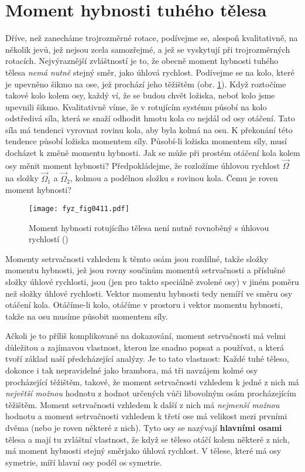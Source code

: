   \section{Moment hybnosti tuhého tělesa}\label{fyz:IchapXXsecIV}
    Dříve, než zanecháme trojrozměrné rotace, podívejme se, alespoň kvalitativně, na několik jevů,
    jež nejsou zcela samozřejmé, a jež se vyskytují při trojrozměrných rotacích. Nejvýraznější
    zvláštností je to, že obecně moment hybnosti tuhého tělesa \emph{nemá nutně} stejný směr, jako
    úhlová rychlost. Podívejme se na kolo, které je upevněno šikmo na ose, jež prochází jeho
    těžištěm (obr. \ref{fyz:fig0411}). Když roztočíme takové kolo kolem osy, každý ví, že se budou
    chvět ložiska, neboť kolo jsme upevnili šikmo. Kvalitativně víme, že v rotujícím systému působí
    na kolo odstředivá síla, která se snaží odhodit hmotu kola co nejdál od osy otáčení. Tato síla
    má tendenci vyrovnat rovinu kola, aby byla kolmá na osu. K překonání této tendence působí
    ložiska momentem síly. Působí-li ložiska momentem síly, musí docházet k změně momentu hybnosti.
    Jak se může při prostém otáčení kola kolem osy měnit moment hybnosti? Předpokládejme, že
    rozložíme úhlovou rychlost \(\vec{\Omega}\) na složky \(\vec{\Omega}_1\) a \(\vec{\Omega}_2\),
    kolmou a podélnou složku s rovinou kola. Čemu je roven moment hybnosti?

    \begin{figure}[ht!] %
      \centering
      \texttt{[image: fyz\_fig0411.pdf]}
      \caption{Moment hybnosti rotujícího tělesa není nutně rovnoběný s úhlovou rychlostí
              (\cite[s.~282]{Feynman01})}
      \label{fyz:fig0411}
    \end{figure}

    Momenty setrvačnosti vzhledem k těmto osám jsou rozdílné, takže složky momentu hybnosti, jež
    jsou rovny součinům momentů setrvačnosti a příslušné složky úhlové rychlosti, jsou (jen pro
    takto speciálně zvolené osy) v jiném poměru než složky úhlové rychlosti. Vektor momentu hybnosti
    tedy nemíří ve směru osy otáčení kola. Otáčíme-li kolo, otáčíme v prostoru i vektor momentu
    hybnosti, takže na osu musíme působit momentem síly.

    Ačkoli je to příliš komplikované na dokazování, moment setrvačnosti má velmi důležitou a
    zajímavou vlastnost, kterou lze snadno popsat a používat, a která tvoří základ naší
    předcházející analýzy. Je to tato vlastnost: Každé tuhé těleso, dokonce i tak nepravidelné jako
    brambora, má tři navzájem kolmé osy procházející těžištěm, takové, že moment setrvačnosti
    vzhledem k jedné z nich má \emph{největší možnou} hodnotu z hodnot určených vůči libovolným osám
    procházejícím těžištěm. Moment setrvačnosti vzhledem k další z nich má \emph{nejmenší možnou}
    hodnotu a moment setrvačnosti vzhledem k třetí ose má velikost mezi prvními dvěma (nebo je roven
    některé z nich). Tyto osy se nazývají \textbf{hlavními osami} tělesa a mají tu zvláštní
    vlastnost, že když se těleso otáčí kolem některé z nich, má moment hybnosti stejný směrjako
    úhlová rychlost. V tělese, které má osy symetrie, míří hlavní osy podél os symetrie.

